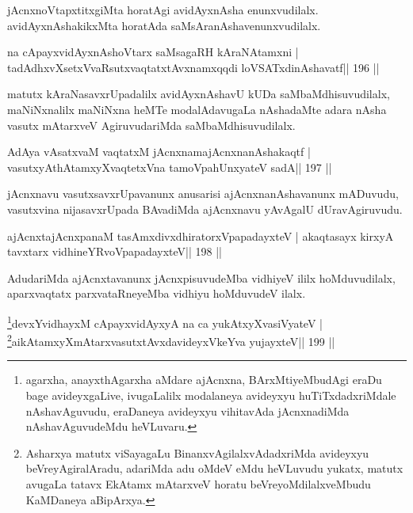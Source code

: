 \begin{artha}
jAcnxnoVtapxtitxgiMta horatAgi avidAyxnAsha enunxvudilalx. avidAyxnAshakikxMta horatAda saMsAranAshavenunxvudilalx.
\end{artha}

\begin{shl}
na cApayxvidAyxnAshoV\s tarx saMsagaRH kAraNAtamxni |
tadAdhxvXsetxVvaRsutxvaqtatxtAvxnamxqqdi loVSATxdinAshavatf\hfill || 196 ||
\end{shl}

\begin{artha}
matutx kAraNasavxrUpadalilx avidAyxnAshavU kUDa saMbaMdhisuvudilalx, maNiNxnalilx maNiNxna heMTe modalAdavugaLa nAshadaMte adara nAsha vasutx mAtarxveV AgiruvudariMda saMbaMdhisuvudilalx.
\end{artha}

\begin{shl}
AdAya vAsatxvaM vaqtatxM jAcnxnamajAcnxnanAshakaqtf |
vasutxyAthAtamxyXvaqtetxVna tamoV\s pahUnxyateV sadA\hfill || 197 ||
\end{shl}

\begin{artha}
jAcnxnavu vasutxsavxrUpavanunx anusarisi ajAcnxnanAshavanunx mADuvudu, vasutxvina nijasavxrUpada BAvadiMda ajAcnxnavu yAvAgalU dUravAgiruvudu.
\end{artha}

\begin{shl}
ajAcnxtajAcnxpanaM tasAmxdivxdhiratorxVpapadayxteV |
akaqtasayx kirxyA tavxtarx vidhineYRvoVpapadayxteV\hfill || 198 ||
\end{shl}

\begin{artha}
AdudariMda ajAcnxtavanunx jAcnxpisuvudeMba vidhiyeV ililx hoMduvudilalx, aparxvaqtatx parxvataRneyeMba vidhiyu hoMduvudeV ilalx.
\end{artha}


\begin{shl}
\footnote{agarxha, anayxthAgarxha aMdare ajAcnxna, BArxMtiyeMbudAgi eraDu bage avideyxgaLive, ivugaLalilx modalaneya avideyxyu huTiTxdadxriMdale nAshavAguvudu, eraDaneya avideyxyu vihitavAda jAcnxnadiMda nAshavAguvudeMdu heVLuvaru.}devxYvidhayxM cApayxvidAyxyA na ca yukAtxyX\s vasiVyateV |
\footnote{Asharxya matutx viSayagaLu BinanxvAgilalxvAdadxriMda avideyxyu beVreyAgiralAradu, adariMda adu oMdeV eMdu heVLuvudu yukatx, matutx avugaLa tatavx EkAtamx mAtarxveV horatu beVreyoMdilalxveMbudu KaMDaneya aBipArxya.}aikAtamxyXmAtarxvasutxtAvxdavideyxVkeYva yujayxteV\hfill || 199 ||
\end{shl}

